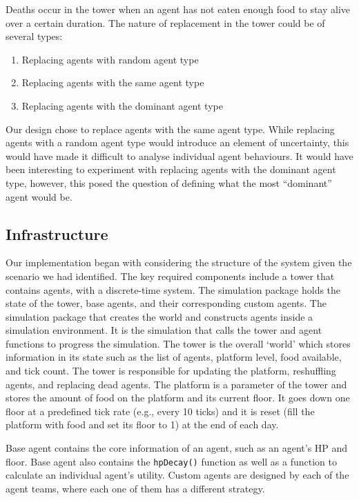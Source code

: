 Deaths occur in the tower when an agent has not eaten enough food to stay alive over a certain duration. The nature of replacement in the tower could be of several types:
\begin{enumerate}
    \item Replacing agents with random agent type
    \item Replacing agents with the same agent type
    \item Replacing agents with the dominant agent type
\end{enumerate}

Our design chose to replace agents with the same agent type. While replacing agents with a random agent type would introduce an element of uncertainty, this would have made it difficult to analyse individual agent behaviours. It would have been interesting to experiment with replacing agents with the dominant agent type, however, this posed the question of defining what the most ``dominant'' agent would be.

\subsection{Infrastructure}

Our implementation began with considering the structure of the system given the scenario we had identified. The key required components include a tower that contains agents, with a discrete-time system.
The simulation package holds the state of the tower, base agents, and their corresponding custom agents. The simulation package that creates the world and constructs agents inside a simulation environment. It is the simulation that calls the tower and agent functions to progress the simulation.
The tower is the overall `world' which stores information in its state such as the list of agents, platform level, food available, and tick count. The tower is responsible for updating the platform, reshuffling agents, and replacing dead agents.
The platform is a parameter of the tower and stores the amount of food on the platform and its current floor. It goes down one floor at a predefined tick rate (e.g., every 10 ticks) and it is reset (fill the platform with food and set its floor to 1) at the end of each day.

Base agent contains the core information of an agent, such as an agent's HP and floor. Base agent also contains the \lstinline$hpDecay()$ function as well as a function to calculate an individual agent's utility. 
Custom agents are designed by each of the agent teams, where each one of them has a different strategy.

